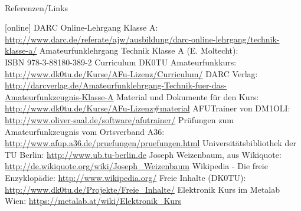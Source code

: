 \renewcommand{\refname}{Referenzen}

\hypertarget{refs}{}
\textcolor{white}{} \\ %
\Large Referenzen/Links
\footnotesize

\begin{thebibliography}{}
    [online]
      DARC Online-Lehrgang Klasse A:
                    \url{http://www.darc.de/referate/ajw/ausbildung/darc-online-lehrgang/technik-klasse-a/}
     Amateurfunklehrgang Technik Klasse A (E. Moltecht): \\
                    ISBN 978-3-88180-389-2
      Curriculum DK0TU Amateurfunkkurs: \\
                    \url{http://www.dk0tu.de/Kurse/AFu-Lizenz/Curriculum/}
     DARC Verlag:
                    \url{http://darcverlag.de/Amateurfunklehrgang-Technik-fuer-das-Amateurfunkzeugnis-Klasse-A}
       Material und Dokumente für den Kurs:
                    \url{http://www.dk0tu.de/Kurse/AFu-Lizenz#material}
      AFUTrainer von DM1OLI:
                    \url{http://www.oliver-saal.de/software/afutrainer/}
      Prüfungen zum Amateurfunkzeugnis vom Ortsverband A36:
                    \url{http://www.afup.a36.de/pruefungen/pruefungen.html}
        Universitätsbibliothek der TU Berlin:
                    \url{http://www.ub.tu-berlin.de}
     Joseph Weizenbaum, aus Wikiquote:
                    \url{http://de.wikiquote.org/wiki/Joseph_Weizenbaum}
        Wikipedia - Die freie Enzyklopädie:
                    \url{http://www.wikipedia.org/}
        Freie Inhalte (DK0TU):
                    \url{http://www.dk0tu.de/Projekte/Freie_Inhalte/}
      Elektronik Kurs im Metalab Wien:
                    \url{https://metalab.at/wiki/Elektronik_Kurs}
\end{thebibliography} 


